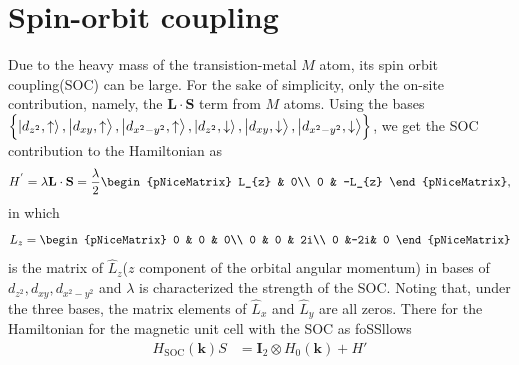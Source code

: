 \documentclass{report}
\newcommand{\f}[2]{\dfrac{#1}{#2}}
\begin{document}
\section{Spin-orbit coupling}
Due to the heavy mass of the transistion-metal $M$ atom, its spin orbit coupling(SOC) can be large. For the sake of simplicity, only the on-site contribution, namely, the $\mathbf{L \cdot S}$ term from $M$ atoms. Using the bases $\left\{\ket{d_{z^{2}},\uparrow},\ket{d_{xy},\uparrow},\ket{d_{x^{2} - y^{2}},\uparrow},\ket{d_{z^{2}},\downarrow},\ket{d_{xy},\downarrow},\ket{d_{x^{2} - y^{2} },\downarrow}\right\}$, we get the SOC contribution to the Hamiltonian as
\begin{gather}
	H^{'} 
	= \lambda \mathbf{L \cdot S}
	= \f{\lambda}{2}
	\begin{pNiceMatrix}
		L_{z} & 0\\
		0 & -L_{z}
	\end{pNiceMatrix},
\end{gather}
in which
\begin{gather}
	L_{z}
	=
	\begin{pNiceMatrix}
		0 & 0 & 0\\
		0 & 0 & 2i\\
		0 &-2i& 0
	\end{pNiceMatrix}
\end{gather}
is the matrix of $\hat{L}_{z}$($z$ component of the orbital angular momentum) in bases of $d_{z^{2}},d_{xy},d_{x^{2} - y^{2}}$ and $\lambda$ is characterized the strength of the SOC. Noting that, under the three bases, the matrix elements of $\hat{L}_{x}$ and $\hat{L}_{y}$ are all zeros. There for the Hamiltonian for the magnetic unit cell with the SOC as foSSllows
\begin{equation}
	\begin{aligned}
		H_{\text{SOC}}(\mathbf{k})S
		& = \mathbf{I}_{2} \otimes H_{0}(\mathbf{k}) + H'
	\end{aligned}
\end{equation}
\end{document}
